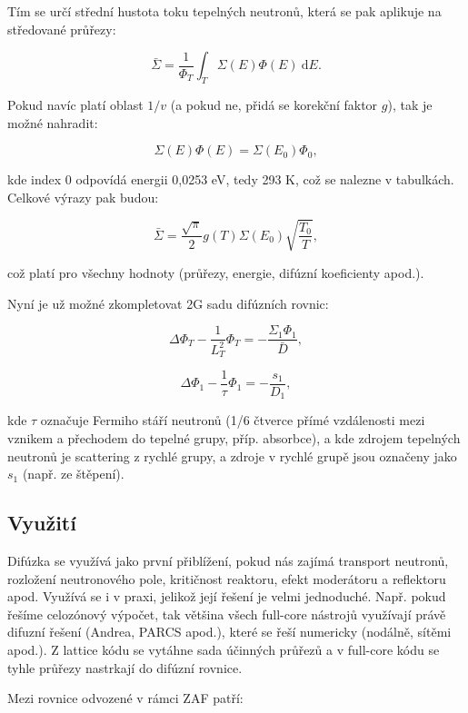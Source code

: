 Tím se určí střední hustota toku tepelných neutronů, která se pak aplikuje na středované průřezy:

$$ \bar{\Sigma} = \dfrac{1}{\Phi_T} \int_T \Sigma(E) \Phi(E) \: \text{d}E.$$

Pokud navíc platí oblast $1/v$ (a pokud ne, přidá se korekční faktor $g$), tak je možné nahradit:

$$ \Sigma(E) \Phi(E) = \Sigma(E_0) \Phi_0, $$

kde index 0 odpovídá energii 0,0253 eV, tedy 293 K, což se nalezne v tabulkách. Celkové výrazy pak budou:

$$ \boxed{\bar{\Sigma} = \dfrac{\sqrt{\pi}}{2} g(T) \Sigma(E_0) \sqrt{\dfrac{T_0}{T}},} $$

což platí pro všechny hodnoty (průřezy, energie, difúzní koeficienty apod.).

Nyní je už možné zkompletovat 2G sadu difúzních rovnic:

\begin{equation}
    \boxed{
        \Delta \Phi_T - \dfrac{1}{L_T^2} \Phi_T = -\dfrac{\Sigma_1 \Phi_1}{\bar{D}},
    }
\end{equation}

\begin{equation}
    \boxed{
        \Delta \Phi_1 - \dfrac{1}{\tau} \Phi_1 = -\dfrac{s_1}{D_1},
    }
\end{equation}

kde $\tau$ označuje Fermiho stáří neutronů (1/6 čtverce přímé vzdálenosti mezi vznikem a přechodem do tepelné grupy, příp. absorbce), a kde zdrojem tepelných neutronů je scattering z rychlé grupy, a zdroje v rychlé grupě jsou označeny jako $s_1$ (např. ze štěpení).

\subsection{Využití}

Difúzka se využívá jako první přiblížení, pokud nás zajímá transport neutronů, rozložení neutronového pole, kritičnost reaktoru, efekt moderátoru a reflektoru apod. Využívá se i v praxi, jelikož její řešení je velmi jednoduché. Např. pokud řešíme celozónový výpočet, tak většina všech full-core nástrojů využívají právě difuzní řešení (Andrea, PARCS apod.), které se řeší numericky (nodálně, sítěmi apod.). Z lattice kódu se vytáhne sada účinných průřezů a v full-core kódu se tyhle průřezy nastrkají do difúzní rovnice.

Mezi rovnice odvozené v rámci ZAF patří:

